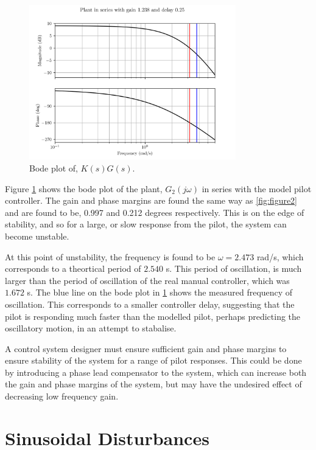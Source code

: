 \documentclass[8pt]{article}
\begin{document}
\begin{figure}[H]
    \centering
    \includegraphics[width=0.8\textwidth]{figures/FIGURE_6.png}
    \caption{Bode plot of, $K(s)G(s)$.}
    \label{fig:figure6}
\end{figure}

Figure \ref{fig:figure6} shows the bode plot of the plant, $G_2(j\omega)$ in series with the model pilot controller.
The gain and phase margins are found the same way as \ref{fig:figure2} and are found to be, 0.997 and 0.212 degrees respectively.
This is on the edge of stability, and so for a large, or slow response from the pilot, the system can become unstable.

At this point of unstability, the frequency is found to be $\omega = 2.473$ rad/s, which corresponds to a theortical period of $2.540$ s.
This period of oscillation, is much larger than the period of oscillation of the real manual controller, which was $1.672$ s.
The blue line on the bode plot in \ref{fig:figure6} shows the measured frequency of oscillation. 
This corresponds to a smaller controller delay, suggesting that the pilot is responding much faster than the modelled pilot, perhaps predicting the oscillatory motion, in an attempt to stabalise.

A control system designer must ensure sufficient gain and phase margins to ensure stability of the system for a range of pilot responses.
This could be done by introducing a phase lead compensator to the system, which can increase both the gain and phase margins of the system, but may have the undesired effect of decreasing low frequency gain.

\newpage

\section{Sinusoidal Disturbances}
\end{document}
